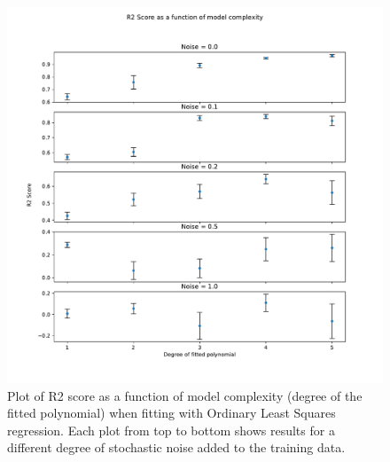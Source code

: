 \begin{figure}[h]
    \includegraphics[width = 0.8\paperwidth]{figures/r2_vs_complexity_ols.pdf}
    \caption{Plot of R2 score as a function of model complexity (degree of the
	    fitted polynomial) when fitting with Ordinary Least Squares regression. Each plot
	    from top to bottom shows results for a different degree of stochastic noise added
	    to the training data.}
    \label{fig:ols-r2-complexity}
\end{figure}

